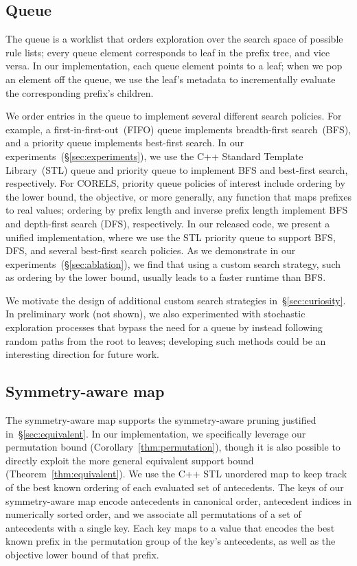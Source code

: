\subsection{Queue}
\label{sec:queue}

The queue is a worklist that orders exploration over the search space of possible
rule lists; every queue element corresponds to leaf in the prefix tree, and vice versa.
%
In our implementation, each queue element points to a leaf;
when we pop an element off the queue, we use the leaf's metadata to
incrementally evaluate the corresponding prefix's children.

We order entries in the queue to implement several different search policies.
%
For example, a first-in-first-out~(FIFO) queue implements breadth-first search~(BFS),
and a priority queue implements best-first search.
%
In our experiments~(\S\ref{sec:experiments}), we use the C++ Standard Template Library~(STL)
queue and priority queue to implement BFS and best-first search, respectively.
%
For CORELS, priority queue policies of interest include ordering by the lower bound,
the objective, or more generally, any function that maps prefixes to real values;
ordering by prefix length and inverse prefix length implement
BFS and depth-first search (DFS), respectively.
%
In our released code, we present a unified implementation,
where we use the STL priority queue to support BFS, DFS,
and several best-first search policies.
%
As we demonstrate in our experiments~(\S\ref{sec:ablation}),
we find that using a custom search strategy,
such as ordering by the lower bound, usually leads to a faster runtime than BFS.

We motivate the design of additional custom search strategies in~\S\ref{sec:curiosity}.
%
In preliminary work (not shown), we also experimented with
stochastic exploration processes that bypass the need for a queue
by instead following random paths from the root to leaves;
developing such methods could be an interesting direction for future work.

\subsection{Symmetry-aware map}
\label{sec:pmap}

The symmetry-aware map supports the symmetry-aware pruning justified in~\S\ref{sec:equivalent}.
%
In our implementation, we specifically leverage our permutation bound
(Corollary~\ref{thm:permutation}), though it is also possible to directly
exploit the more general equivalent support bound (Theorem~\ref{thm:equivalent}).
%
We use the C++ STL unordered map to keep track of the best known ordering
of each evaluated set of antecedents.
%
The keys of our symmetry-aware map encode antecedents in canonical order,
\ie antecedent indices in numerically sorted order,
and we associate all permutations of a set of antecedents with a single key.
%
Each key maps to a value that encodes the best known prefix in the permutation
group of the key's antecedents, as well as the objective lower bound of that prefix.

